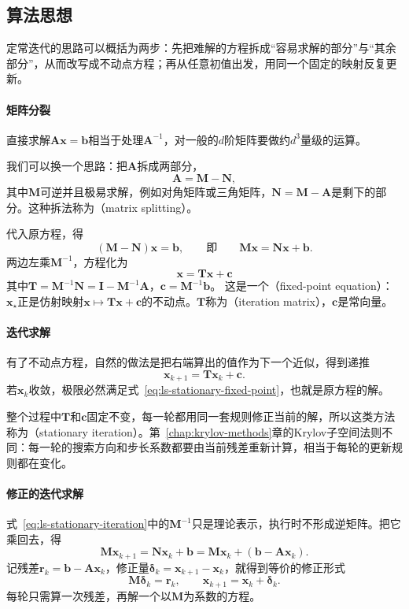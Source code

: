 \subsection{算法思想}

定常迭代的思路可以概括为两步：先把难解的方程拆成“容易求解的部分”与“其余部分”，从而改写成不动点方程；再从任意初值出发，用同一个固定的映射反复更新。

\paragraph{矩阵分裂}
直接求解$\bm A\bm x=\bm b$相当于处理$\bm A^{-1}$，对一般的$d$阶矩阵要做约$d^3$量级的运算。

我们可以换一个思路：把$\bm A$拆成两部分，
\begin{equation}
 \bm A=\bm M-\bm N ,
 \label{eq:ls-stationary-splitting}
\end{equation}
其中$\bm M$可逆并且极易求解，例如对角矩阵或三角矩阵，$\bm N=\bm M-\bm A$是剩下的部分。这种拆法称为（matrix splitting）。

代入原方程，得
\[
 (\bm M-\bm N)\bm x=\bm b,\qquad\text{即}\qquad \bm M\bm x=\bm N\bm x+\bm b .
\]
两边左乘$\bm M^{-1}$，方程化为
\begin{equation}
 \bm x=\bm T\bm x+\bm c
 \label{eq:ls-stationary-fixed-point}
\end{equation}
其中$
 \bm T=\bm M^{-1}\bm N=\bm I-\bm M^{-1}\bm A$，$\bm c=\bm M^{-1}\bm b$。
这是一个（fixed-point equation）：$\bm x_\star$正是仿射映射$\bm x\mapsto\bm T\bm x+\bm c$的不动点。$\bm T$称为（iteration matrix），$\bm c$是常向量。

\paragraph{迭代求解}
有了不动点方程，自然的做法是把右端算出的值作为下一个近似，得到递推
\begin{equation}
 \bm x_{k+1}=\bm T\bm x_k+\bm c .
 \label{eq:ls-stationary-iteration}
\end{equation}
若$\bm x_k$收敛，极限必然满足式~\eqref{eq:ls-stationary-fixed-point}，也就是原方程的解。

整个过程中$\bm T$和$\bm c$固定不变，每一轮都用同一套规则修正当前的解，所以这类方法称为（stationary iteration）。第~\ref{chap:krylov-methods}章的Krylov子空间法则不同：每一轮的搜索方向和步长系数都要由当前残差重新计算，相当于每轮的更新规则都在变化。

\paragraph{修正的迭代求解}
式~\eqref{eq:ls-stationary-iteration}中的$\bm M^{-1}$只是理论表示，执行时不形成逆矩阵。把它乘回去，得
\[ 
  \bm M\bm x_{k+1}=\bm N\bm x_k+\bm b=\bm M\bm x_k+(\bm b-\bm A\bm x_k) .
\]
记残差$\bm r_k=\bm b-\bm A\bm x_k$，修正量$\bm\delta_k=\bm x_{k+1}-\bm x_k$，就得到等价的修正形式
\begin{equation}
 \bm M\bm\delta_k=\bm r_k,\qquad \bm x_{k+1}=\bm x_k+\bm\delta_k .
 \label{eq:ls-stationary-correction}
\end{equation}
每轮只需算一次残差，再解一个以$\bm M$为系数的方程。

